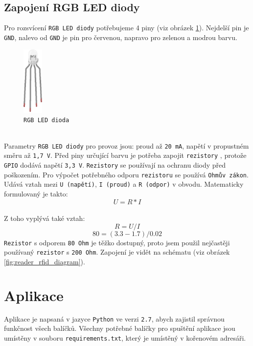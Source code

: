 \documentclass[czech,BP]{thesiskiv}
\begin{document}
\subsection{Zapojení RGB LED diody}
	Pro rozsvícení \texttt{RGB LED diody} potřebujeme 4 piny (viz obrázek \ref{fig:rgb_led_dioda}). Nejdelší pin je \texttt{GND}, nalevo od \texttt{GND} je pin pro červenou, napravo pro zelenou a modrou barvu.
	\begin{figure}[H]
		\centering
		\includegraphics[width=0.09\textwidth]{../images/rgb_led_dioda.png}	
		\caption{\texttt{RGB LED dioda}}
		\label{fig:rgb_led_dioda}
\end{figure}
\ \\
Parametry \texttt{RGB LED diody} pro provoz jsou: proud až \texttt{20 mA}, napětí v propustném směru až \texttt{1,7 V}.
Před piny určující barvu je potřeba zapojit \texttt{rezistory} \cite{voda2016rezistor}, protože \texttt{GPIO} dodává napětí \texttt{3,3 V}.
\texttt{Rezistory} se používají na ochranu diody před poškozením. 
Pro výpočet potřebného odporu \texttt{rezistoru} se používá \texttt{Ohmův zákon}. Udává vztah mezi \texttt{U (napětí)}, \texttt{I (proud)} a  \texttt{R (odpor)} v obvodu. Matematicky formulovaný je takto:
\[ U = R * I \]
\ \\
Z toho vyplývá také vztah:
\[ R = U/I \]
\[ 80=(3.3-1.7)/0.02 \]
\texttt{Rezistor} s odporem \texttt{80 Ohm} je těžko dostupný, proto jsem použil nejčastěji používaný \texttt{rezistor} s \texttt{200 Ohm}.
Zapojení je vidět na schématu (viz obrázek \ref{fig:reader_rfid_diagram}).


	\section{Aplikace}
Aplikace je napsaná v jazyce \texttt{Python} ve verzi \texttt{2.7}, abych zajistil správnou funkčnost všech balíčků. Všechny potřebné balíčky pro spuštění aplikace jsou umístěny v souboru \texttt{requirements.txt}, který je umístěný v kořenovém adresáři.
\end{document}
